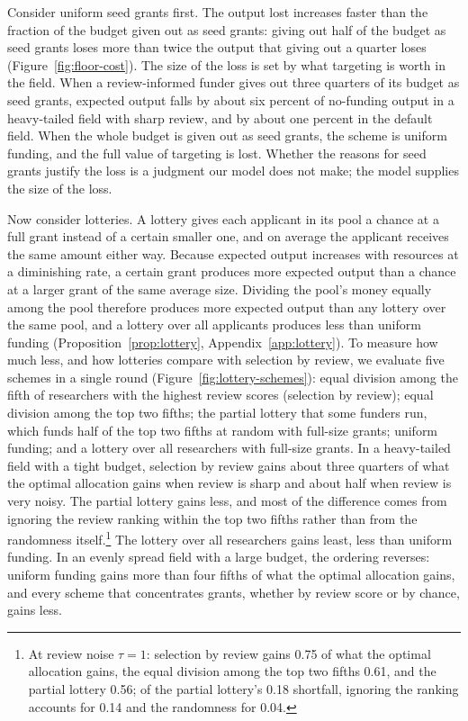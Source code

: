 \documentclass[article, 11pt, reqno]{amsart}
\theoremstyle{named}
\begin{document}
Consider uniform seed grants first. The output lost increases faster than the fraction of the budget given out as seed grants: giving out half of the budget as seed grants loses more than twice the output that giving out a quarter loses (Figure~\ref{fig:floor-cost}). The size of the loss is set by what targeting is worth in the field. When a review-informed funder gives out three quarters of its budget as seed grants, expected output falls by about six percent of no-funding output in a heavy-tailed field with sharp review, and by about one percent in the default field. When the whole budget is given out as seed grants, the scheme is uniform funding, and the full value of targeting is lost. Whether the reasons for seed grants justify the loss is a judgment our model does not make; the model supplies the size of the loss.



Now consider lotteries. A lottery gives each applicant in its pool a chance at a full grant instead of a certain smaller one, and on average the applicant receives the same amount either way. Because expected output increases with resources at a diminishing rate, a certain grant produces more expected output than a chance at a larger grant of the same average size. Dividing the pool's money equally among the pool therefore produces more expected output than any lottery over the same pool, and a lottery over all applicants produces less than uniform funding (Proposition~\ref{prop:lottery}, Appendix~\ref{app:lottery}). To measure how much less, and how lotteries compare with selection by review, we evaluate five schemes in a single round (Figure~\ref{fig:lottery-schemes}): equal division among the fifth of researchers with the highest review scores (selection by review); equal division among the top two fifths; the partial lottery that some funders run, which funds half of the top two fifths at random with full-size grants; uniform funding; and a lottery over all researchers with full-size grants. In a heavy-tailed field with a tight budget, selection by review gains about three quarters of what the optimal allocation gains when review is sharp and about half when review is very noisy. The partial lottery gains less, and most of the difference comes from ignoring the review ranking within the top two fifths rather than from the randomness itself.\footnote{At review noise $\tau = 1$: selection by review gains 0.75 of what the optimal allocation gains, the equal division among the top two fifths 0.61, and the partial lottery 0.56; of the partial lottery's 0.18 shortfall, ignoring the ranking accounts for 0.14 and the randomness for 0.04.} The lottery over all researchers gains least, less than uniform funding. In an evenly spread field with a large budget, the ordering reverses: uniform funding gains more than four fifths of what the optimal allocation gains, and every scheme that concentrates grants, whether by review score or by chance, gains less.
\end{document}
